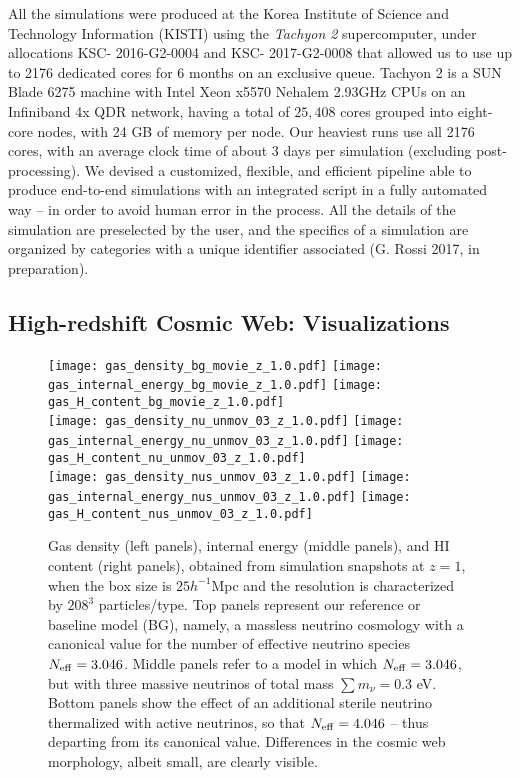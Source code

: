 \documentclass{emulateapj}
\begin{document}
All the simulations were produced at the Korea Institute of Science and Technology Information (KISTI) using the \textit{Tachyon  2} supercomputer, under allocations KSC- 2016-G2-0004 and
KSC- 2017-G2-0008 
that allowed us to use up to 2176 dedicated cores for 6 months on an exclusive queue.
Tachyon 2  is a SUN Blade 6275 machine with Intel Xeon x5570 Nehalem 2.93GHz CPUs on an Infiniband 4x QDR network, having a total of $25,408$ cores grouped into 
eight-core nodes, with 24 GB of memory per node. Our heaviest runs use all 2176 cores, with an average clock time of about 3 days per simulation (excluding post-processing).
We devised a customized, flexible, and efficient pipeline able to produce end-to-end simulations with an integrated script in a fully automated way -- in order to avoid
human error in the process. All the details of the simulation are preselected by the user, and the specifics of a simulation are 
organized by categories with a unique identifier associated  (G. Rossi 2017, in preparation).


\subsection{High-redshift Cosmic Web: Visualizations}


\begin{figure*}
\centering
\texttt{[image: gas\_density\_bg\_movie\_z\_1.0.pdf]}
\texttt{[image: gas\_internal\_energy\_bg\_movie\_z\_1.0.pdf]}
\texttt{[image: gas\_H\_content\_bg\_movie\_z\_1.0.pdf]}\\
\texttt{[image: gas\_density\_nu\_unmov\_03\_z\_1.0.pdf]}
\texttt{[image: gas\_internal\_energy\_nu\_unmov\_03\_z\_1.0.pdf]}
\texttt{[image: gas\_H\_content\_nu\_unmov\_03\_z\_1.0.pdf]}\\
\texttt{[image: gas\_density\_nus\_unmov\_03\_z\_1.0.pdf]}
\texttt{[image: gas\_internal\_energy\_nus\_unmov\_03\_z\_1.0.pdf]}
\texttt{[image: gas\_H\_content\_nus\_unmov\_03\_z\_1.0.pdf]}
\caption{Gas density (left panels), internal energy (middle panels), and HI content (right panels), obtained from simulation snapshots at $z=1$, 
when the box size is $25h^{-1}$Mpc and the resolution is  characterized by $208^3$ particles/type. Top panels represent our reference or baseline model (BG),  
namely, a massless neutrino cosmology with a canonical value for the number of effective neutrino species  $N_{\rm eff}=3.046$. Middle panels refer
to a model in which $N_{\rm eff}=3.046$, but with three massive neutrinos of total mass $\sum m_{\nu}=0.3$ eV.
Bottom panels show the effect of an additional sterile neutrino thermalized with active neutrinos, so that $N_{\rm eff}=4.046$ -- thus departing from its canonical value.
Differences in the cosmic web morphology, albeit small, are clearly visible.}
\label{fig_sims_gas_visualization_A}
\end{figure*}
\end{document}
